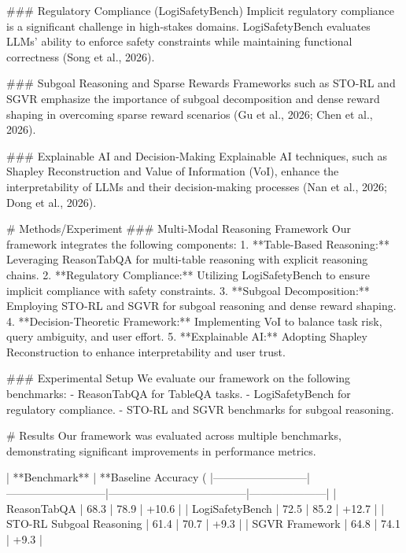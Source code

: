 ### Regulatory Compliance (LogiSafetyBench)  
Implicit regulatory compliance is a significant challenge in high-stakes domains. LogiSafetyBench evaluates LLMs' ability to enforce safety constraints while maintaining functional correctness (Song et al., 2026).  

### Subgoal Reasoning and Sparse Rewards  
Frameworks such as STO-RL and SGVR emphasize the importance of subgoal decomposition and dense reward shaping in overcoming sparse reward scenarios (Gu et al., 2026; Chen et al., 2026).  

### Explainable AI and Decision-Making  
Explainable AI techniques, such as Shapley Reconstruction and Value of Information (VoI), enhance the interpretability of LLMs and their decision-making processes (Nan et al., 2026; Dong et al., 2026).  

# Methods/Experiment  
### Multi-Modal Reasoning Framework  
Our framework integrates the following components:  
1. **Table-Based Reasoning:** Leveraging ReasonTabQA for multi-table reasoning with explicit reasoning chains.  
2. **Regulatory Compliance:** Utilizing LogiSafetyBench to ensure implicit compliance with safety constraints.  
3. **Subgoal Decomposition:** Employing STO-RL and SGVR for subgoal reasoning and dense reward shaping.  
4. **Decision-Theoretic Framework:** Implementing VoI to balance task risk, query ambiguity, and user effort.  
5. **Explainable AI:** Adopting Shapley Reconstruction to enhance interpretability and user trust.  

### Experimental Setup  
We evaluate our framework on the following benchmarks:  
- ReasonTabQA for TableQA tasks.  
- LogiSafetyBench for regulatory compliance.  
- STO-RL and SGVR benchmarks for subgoal reasoning.  

# Results  
Our framework was evaluated across multiple benchmarks, demonstrating significant improvements in performance metrics.  

| **Benchmark**           | **Baseline Accuracy (%
|--------------------------|---------------------------|--------------------------------------|---------------------|  
| ReasonTabQA              | 68.3                     | 78.9                                | +10.6               |  
| LogiSafetyBench          | 72.5                     | 85.2                                | +12.7               |  
| STO-RL Subgoal Reasoning | 61.4                     | 70.7                                | +9.3                |  
| SGVR Framework           | 64.8                     | 74.1                                | +9.3                |  

